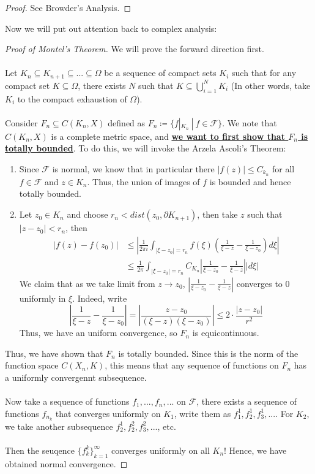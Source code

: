 \begin{proof}
    See Browder's Analysis.
\end{proof}

Now we will put out attention back to complex analysis:

\begin{proof}[Proof of Montel's Theorem]
    We will prove the forward direction first.\\\\
    Let $K_n \subseteq K_{n+1} \subseteq ... \subseteq \Omega$ be a sequence of compact sets $K_i$ such that for any compact set $K \subseteq \Omega$, there exists $N$ such that $K \subseteq \bigcup_{i = 1}^N K_i$ (In other words, take $K_i$ to the compact exhaustion of $\Omega$).\\\\
    Consider $F_n \subseteq C(K_n, X)$ defined as $F_n \coloneqq \{f|_{K_n}\ |\ f \in \mathcal{F}\}$. We note that $C(K_n, X)$ is a complete metric space, and \ul{\textbf{we want to first show that $F_n$ is totally bounded}}. To do this, we will invoke the Arzela Ascoli's Theorem:
    \begin{enumerate}
        \item Since $\mathcal{F}$ is normal, we know that in particular there $|f(z)| \leq C_{k_n}$ for all $f \in \mathcal{F}$ and $z \in K_n$. Thus, the union of images of $f$ is bounded and hence totally bounded.
        \item Let $z_0 \in K_n$ and choose $r_n < dist(z_0, \partial K_{n+1})$, then take $z$ such that $|z - z_0| < r_n$, then
        \begin{align*}
            |f(z) - f(z_0)| &\leq |\frac{1}{2\pi i} \int_{|\xi - z_0| = r_n} f(\xi)(\frac{1}{\xi - z} - \frac{1}{\xi - z_0}) d\xi| \tag*{Cauchy's Integral Formula}\\
            &\leq \frac{1}{2\pi} \int_{|\xi - z_0| = r_n} C_{K_n} |\frac{1}{\xi - z_0} - \frac{1}{\xi - z}| |d\xi|
        \end{align*}
        We claim that as we take limit from $z \to z_0$, $|\frac{1}{\xi - z_0} - \frac{1}{\xi - z}|$ converges to $0$ uniformly in $\xi$. Indeed, write
        \[|\frac{1}{\xi - z} - \frac{1}{\xi - z_0}| = |\frac{z - z_0}{(\xi - z)(\xi - z_0)}| \leq 2\cdot\frac{|z - z_0|}{r^2}\]
        Thus, we have an uniform convergence, so $F_n$ is equicontinuous.
    \end{enumerate}
    Thus, we have shown that $F_n$ is totally bounded. Since this is the norm of the function space $C(X_n, K)$, this means that any sequence of functions on $F_n$ has a uniformly convergennt subsequence.\\\\
    Now take a sequence of functions $f_1, ..., f_n, ...$ on $\mathcal{F}$, there exists a sequence of functions $f_{n_k}$ that converges uniformly on $K_1$, write them as $f_1^1, f_2^1, f_3^1, ...$. For $K_2$, we take another subsequence $f_2^1, f_2^2, f_3^2, ...$, etc.\\\\
    Then the seuqence $\{f_k^k\}_{k = 1}^\infty$ converges uniformly on all $K_n$! Hence, we have obtained normal convergence.
\end{proof}
